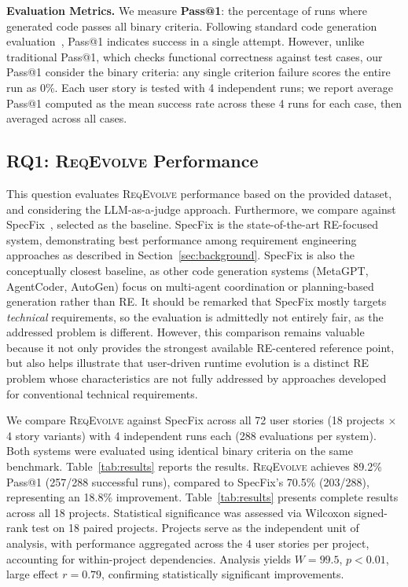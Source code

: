 \documentclass[sigconf,screen]{acmart}
\begin{document}
\textbf{Evaluation Metrics.} We measure \textbf{Pass@1}: the percentage of runs where generated code passes all binary criteria. Following standard code generation evaluation~\cite{humaneval}, Pass@1 indicates success in a single attempt. However, unlike traditional Pass@1, which checks functional correctness against test cases, our Pass@1 consider the binary criteria:  any single criterion failure scores the entire run as 0\%. Each user story is tested with 4 independent runs; we report average Pass@1 computed as the mean success rate across these 4 runs for each case, then averaged across all cases.

\subsection{RQ1: \textsc{ReqEvolve} Performance}

This question evaluates \textsc{ReqEvolve} performance based on the provided dataset, and considering the LLM-as-a-judge approach. Furthermore, we compare against SpecFix~\cite{specfix2025}, selected as the baseline. SpecFix is the state-of-the-art RE-focused system, demonstrating best performance among requirement engineering approaches as described in Section~\ref{sec:background}. SpecFix is also the conceptually closest baseline, as other code generation systems (MetaGPT, AgentCoder, AutoGen) focus on multi-agent coordination or planning-based generation rather than RE.
It should be remarked that SpecFix mostly targets \textit{technical} requirements, so the evaluation is admittedly not entirely fair, as the addressed problem is different.  However, this comparison remains valuable because it not only provides the strongest available RE-centered reference point, but also helps illustrate that user-driven runtime evolution is a distinct RE problem whose characteristics are not fully addressed by approaches developed for conventional technical requirements.

We compare \textsc{ReqEvolve} against SpecFix across all 72 user stories (18 projects $\times$ 4 story variants) with 4 independent runs each (288 evaluations per system). Both systems were evaluated using identical binary criteria on the same benchmark.
Table~\ref{tab:results} reports the results.
\textsc{ReqEvolve} achieves 89.2\% Pass@1 (257/288 successful runs), compared to SpecFix's 70.5\% (203/288), representing an 18.8\% improvement. Table~\ref{tab:results} presents complete results across all 18 projects.
Statistical significance was assessed via Wilcoxon signed-rank test on 18 paired projects. Projects serve as the independent unit of analysis, with performance aggregated across the 4 user stories per project, accounting for within-project dependencies. Analysis yields $W = 99.5$, $p < 0.01$, large effect $r = 0.79$, confirming statistically significant improvements.
\end{document}
